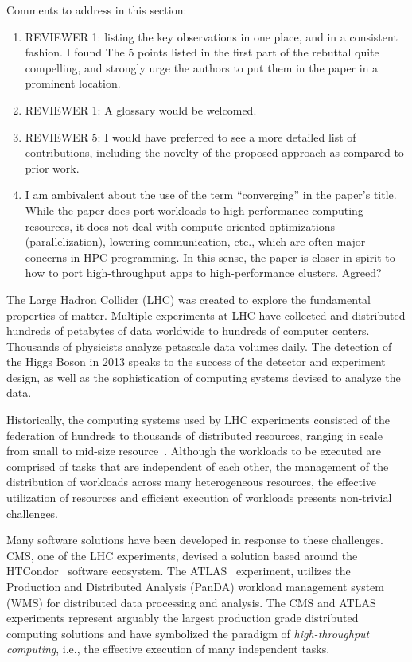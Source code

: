Comments to address in this section:
\begin{enumerate}
	\item REVIEWER 1: listing the key observations in one place, and in a
	consistent fashion. I found The 5 points listed in the first part of the
	rebuttal quite compelling, and strongly urge the authors to put them in
	the paper in a prominent location.
	\item REVIEWER 1: A glossary would be welcomed.
	\item REVIEWER 5: I would have preferred to see a more detailed list of
	contributions, including the novelty of the proposed approach as compared
	to prior work.
	\item I am ambivalent about the use of the term ``converging'' in the
	paper's title. While the paper does port workloads to high-performance
	computing resources, it does not deal with compute-oriented optimizations
	(parallelization), lowering communication, etc., which are often major
	concerns in HPC programming. In this sense, the paper is closer in spirit
	to how to port high-throughput apps to high-performance clusters. Agreed?
\end{enumerate}


The Large Hadron Collider (LHC) was created to explore the fundamental
properties of matter. Multiple experiments at LHC have collected and
distributed hundreds of petabytes of data worldwide to hundreds of computer
centers. Thousands of physicists analyze petascale data volumes daily. The
detection of the Higgs Boson in 2013 speaks to the success of the detector
and experiment design, as well as the sophistication of computing systems
devised to analyze the data.

Historically, the computing systems used by LHC experiments consisted of the
federation of hundreds to thousands of distributed resources, %
ranging in scale from small to mid-size resource~\cite{foster2003grid}.
Although the workloads to be executed are comprised of tasks that are
independent of each other, the management of the distribution of workloads
across many heterogeneous resources, the effective utilization of resources
and efficient execution of workloads presents non-trivial challenges.

Many software solutions have been developed in response to these challenges.
CMS, one of the LHC experiments, devised a solution based around the
HTCondor~\cite{thain2005distributed} software ecosystem. The
ATLAS~\cite{Aad:2008} experiment, utilizes the Production and Distributed
Analysis (PanDA) workload management system~\cite{Maeno2011} (WMS) for
distributed data processing and analysis. The CMS and ATLAS experiments
represent arguably the largest production grade distributed computing
solutions and have symbolized the paradigm of {\it high-throughput
computing}, i.e., the effective execution of many independent tasks.

